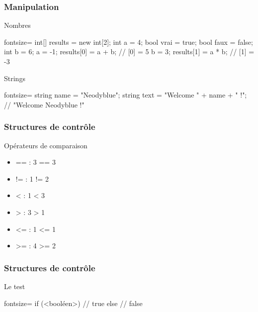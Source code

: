\begin{frame}[fragile]
  \frametitle{Manipulation}

  \begin{center}{\large Nombres}\end{center}
  \begin{csharpcode*}{fontsize=\scriptsize}
    int[] results = new int[2];
    int a = 4;
    bool vrai = true;
    bool faux = false;
    int b = 6;
    a = -1;
    results[0] = a + b; // [0] = 5
    b = 3;
    results[1] = a * b; // [1] = -3
  \end{csharpcode*}

  \pause

  \begin{center}{\large Strings}\end{center}
  \begin{csharpcode*}{fontsize=\scriptsize}
    string name = "Neodyblue";
    string text = "Welcome " + name + " !"; // "Welcome Neodyblue !"
  \end{csharpcode*}
\end{frame}

\begin{frame}[fragile]
  \frametitle{Structures de contrôle}

  \begin{center}{\large Opérateurs de comparaison}\end{center}
  \begin{itemize}
    \item<+-> == : 3 == 3
    \item<+-> != : 1 != 2
    \item<+-> < : 1 < 3
    \item<+-> > : 3 > 1
    \item<+-> <= : 1 <= 1
    \item<+-> >= : 4 >= 2
  \end{itemize}
\end{frame}

\begin{frame}[fragile]
  \frametitle{Structures de contrôle}

  \begin{center}{\large Le test}\end{center}
  \begin{csharpcode*}{fontsize=\scriptsize}
    if (<booléen>)
    {
      // true
    }
    else
    {
      // false
    }
  \end{csharpcode*}
\end{frame}

